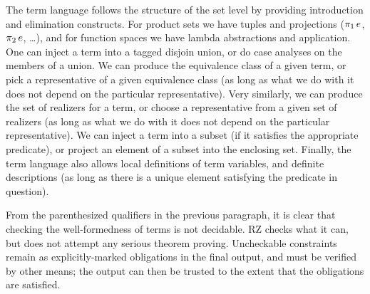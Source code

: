 The term language follows the structure of the set level by providing
introduction and elimination constructs. For product sets we have
tuples and projections ($\mathop{\pi_{1}} e$, $\mathop{\pi_{2}} e$, \ldots),
and for function spaces we have lambda abstractions and application.
One can inject a term into a tagged disjoin union, or do case analyses
on the members of a union. We can produce the equivalence class of a
given term, or pick a representative of a given equivalence class (as
long as what we do with it does not depend on the particular
representative). Very similarly, we can produce the set of realizers
for a term, or choose a representative from a given set of realizers
(as long as what we do with it does not depend on the particular
representative). We can inject a term into a subset (if it satisfies
the appropriate predicate), or project an element of a subset into the
enclosing set. Finally, the term language also allows local
definitions of term variables, and definite descriptions (as long as
there is a unique element satisfying the predicate in question).

From the parenthesized qualifiers in the previous paragraph, it is
clear that checking the well-formedness of terms is not decidable. RZ
checks what it can, but does not attempt any serious theorem proving.
Uncheckable constraints remain as explicitly-marked obligations
in the final output, and must be verified by other means; the output
can then be trusted to the extent that the obligations are satisfied.


